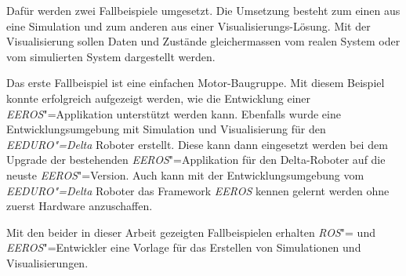 Dafür werden zwei Fallbeispiele umgesetzt.
Die Umsetzung besteht zum einen aus eine Simulation und zum anderen aus einer Visualisierungs-Lösung.
Mit der Visualisierung sollen Daten und Zustände gleichermassen vom realen System oder vom simulierten System dargestellt werden.


Das erste Fallbeispiel ist eine einfachen Motor-Baugruppe.
Mit diesem Beispiel konnte erfolgreich aufgezeigt werden, wie die Entwicklung einer \textit{EEROS}"=Applikation unterstützt werden kann.
Ebenfalls wurde eine Entwicklungsumgebung mit Simulation und Visualisierung für den \textit{EEDURO"=Delta} Roboter erstellt.
Diese kann dann eingesetzt werden bei dem Upgrade der bestehenden \textit{EEROS}"=Applikation für den Delta-Roboter auf die neuste \textit{EEROS}"=Version.
Auch kann mit der Entwicklungsumgebung vom \textit{EEDURO"=Delta} Roboter das Framework \textit{EEROS} kennen gelernt werden ohne zuerst Hardware anzuschaffen.


Mit den beider in dieser Arbeit gezeigten Fallbeispielen erhalten \textit{ROS}"= und \textit{EEROS}"=Entwickler eine Vorlage für das Erstellen von Simulationen und Visualisierungen.

